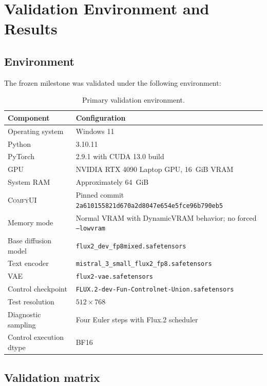 \documentclass[11pt]{article}
\newcommand{\ComfyUI}{\textsc{ComfyUI}}
\newcommand{\code}[1]{\texttt{#1}}
\begin{document}
\section{Validation Environment and Results}

\subsection{Environment}

The frozen milestone was validated under the following environment:

\begin{table}[H]
\centering
\caption{Primary validation environment.}
\begin{tabularx}{\textwidth}{@{}lX@{}}
\toprule
Component & Configuration \\
\midrule
Operating system & Windows 11 \\
Python & 3.10.11 \\
PyTorch & 2.9.1 with CUDA 13.0 build \\
GPU & NVIDIA RTX 4090 Laptop GPU, 16~GiB VRAM \\
System RAM & Approximately 64~GiB \\
\ComfyUI{} & Pinned commit \code{2a610155821d670a2d8047e654e5fce96b790eb5} \\
Memory mode & Normal VRAM with DynamicVRAM behavior; no forced \code{--lowvram} \\
Base diffusion model & \code{flux2\_dev\_fp8mixed.safetensors} \\
Text encoder & \code{mistral\_3\_small\_flux2\_fp8.safetensors} \\
VAE & \code{flux2-vae.safetensors} \\
Control checkpoint & \code{FLUX.2-dev-Fun-Controlnet-Union.safetensors} \\
Test resolution & $512\times768$ \\
Diagnostic sampling & Four Euler steps with Flux.2 scheduler \\
Control execution dtype & BF16 \\
\bottomrule
\end{tabularx}
\end{table}

\subsection{Validation matrix}
\end{document}
